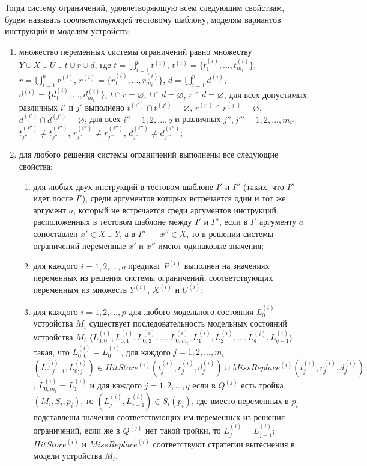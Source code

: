 Тогда систему ограничений, удовлетворяющую всем следующим свойствам, будем называть \emph{соответствующей} тестовому шаблону, моделям вариантов инструкций и моделям устройств:
  \begin{enumerate}
    \item множество переменных системы ограничений равно множеству $Y \cup X \cup U \cup t \cup r \cup d$, где $t = \bigcup_{i=1}^p t^{(i)}$, $t^{(i)} = \{t_1^{(i)}, ..., t_{m_i}^{(i)}\}$, $r = \bigcup_{i=1}^p r^{(i)}$, $r^{(i)} = \{r_1^{(i)}, ..., r_{m_i}^{(i)}\}$, $d = \bigcup_{i=1}^p d^{(i)}$, $d^{(i)} = \{d_1^{(i)}, ..., d_{m_i}^{(i)}\}$, $t \cap r = \varnothing$, $t \cap d = \varnothing$, $r \cap d = \varnothing$, для всех допустимых различных $i'$ и $j'$ выполнено $t^{(i')} \cap t^{(j')} = \varnothing$, $r^{(i')} \cap r^{(j')} = \varnothing$, $d^{(i')} \cap d^{(j')} = \varnothing$, для всех $i'' = 1, 2, ..., q$ и различных $j'', j''' = 1, 2, ..., m_{i''}$ $t_{j''}^{(i'')} \neq t_{j'''}^{(i'')}$, $r_{j''}^{(i'')} \neq r_{j'''}^{(i'')}$, $d_{j''}^{(i'')} \neq d_{j'''}^{(i'')}$;

    \item для любого решения системы ограничений выполнены все следующие свойства:
        \begin{enumerate}
          \item для любых двух инструкций в тестовом шаблоне $I'$ и $I''$ (таких, что $I''$ идет после $I'$), среди аргументов которых встречается один и тот же аргумент $a$, который не встречается среди аргументов инструкций, расположенных в тестовом шаблоне между $I'$ и $I''$, если в $I'$ аргументу $a$ сопоставлен $x' \in X \cup Y$, а в $I''$ --- $x'' \in X$, то в решении системы ограничений переменные $x'$ и $x''$ имеют одинаковые значения;
          \item для каждого $i = 1, 2, ..., q$ предикат $P^{(i)}$ выполнен на значениях переменных из решения системы ограничений, соответствующих переменным из множеств $Y^{(i)}$, $X^{(i)}$ и $U^{(i)}$;
          \item для каждого $i = 1, 2, ..., p$ для любого модельного состояния $L_0^{(i)}$ устройства $M_i$ существует последовательность модельных состояний устройства $M_i$ $\langle L_{0;0}^{(i)}, L_{0;1}^{(i)}, L_{0;2}^{(i)}, ..., L_{0;m_i}^{(i)}, L_1^{(i)}, L_2^{(i)}, ..., L_q^{(i)}, L_{q+1}^{(i)} \rangle$ такая, что $L_{0;0}^{(i)} = L_0^{(i)}$, для каждого $j = 1, 2, ..., m_i$ $(L_{0;j-1}^{(i)}, L_{0;j}^{(i)}) \in HitStore^{(i)} (t_j^{(i)}, r_j^{(i)}, d_j^{(i)}) \cup MissReplace^{(i)} (t_j^{(i)}, r_j^{(i)}, d_j^{(i)})$, $L_{0;m_i}^{(i)} = L_1^{(i)}$ и для каждого $j = 1, 2, ..., q$ если в $Q^{(j)}$ есть тройка $(M_i, S_i, p_i)$, то $(L_j^{(i)}, L_{j+1}^{(i)}) \in S_i(p_i)$, где вместо переменных в $p_i$ подставлены значения соответствующих им переменных из решения ограничений, если же в $Q^{(j)}$ нет такой тройки, то $L_j^{(i)} = L_{j+1}^{(i)}$; $HitStore^{(i)}$ и $MissReplace^{(i)}$ соответствуют стратегии вытеснения в модели устройства $M_i$.
        \end{enumerate}
  \end{enumerate}

